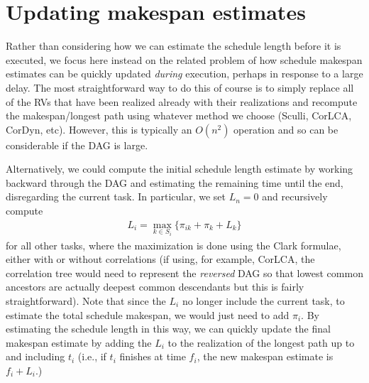 \documentclass[12pt]{article}
\begin{document}
\section{Updating makespan estimates}
\label{sect.updating}


Rather than considering how we can estimate the schedule length before it is executed, we focus here instead on the related problem of how schedule makespan estimates can be quickly updated {\em during} execution, perhaps in response to a large delay. The most straightforward way to do this of course is to simply replace all of the RVs that have been realized already with their realizations and recompute the makespan/longest path using whatever method we choose (Sculli, CorLCA, CorDyn, etc). However, this is typically an $O(n^2)$ operation and so can be considerable if the DAG is large.

Alternatively, we could compute the initial schedule length estimate by working backward through the DAG and estimating the remaining time until the end, disregarding the current task. In particular, we set $L_n = 0$ and recursively compute
\begin{align*}
  L_i = \max_{k \in S_i} \{ \pi_{ik} + \pi_k + L_k  \}
\end{align*}
for all other tasks, where the maximization is done using the Clark formulae, either with or without correlations (if using, for example, CorLCA, the correlation tree would need to represent the {\em reversed} DAG so that lowest common ancestors are actually deepest common descendants but this is fairly straightforward). Note that since the $L_i$ no longer include the current task, to estimate the total schedule makespan, we would just need to add $\pi_i$. By estimating the schedule length in this way, we can quickly update the final makespan estimate by adding the $L_i$ to the realization of the longest path up to and including $t_i$ (i.e., if $t_i$ finishes at time $f_i$, the new makespan estimate is $f_i + L_i$.)
\end{document}
